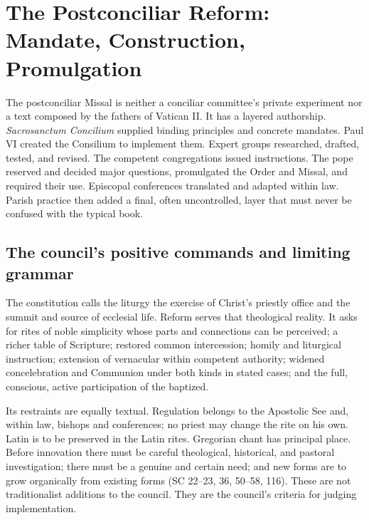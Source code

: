 \section{The Postconciliar Reform: Mandate, Construction, Promulgation}

The postconciliar Missal is neither a conciliar committee's private experiment nor a text composed by the fathers of Vatican II. It has a layered authorship. \emph{Sacrosanctum Concilium} supplied binding principles and concrete mandates. Paul VI created the Consilium to implement them. Expert groups researched, drafted, tested, and revised. The competent congregations issued instructions. The pope reserved and decided major questions, promulgated the Order and Missal, and required their use. Episcopal conferences translated and adapted within law. Parish practice then added a final, often uncontrolled, layer that must never be confused with the typical book.

\subsection{The council's positive commands and limiting grammar}

The constitution calls the liturgy the exercise of Christ's priestly office and the summit and source of ecclesial life. Reform serves that theological reality. It asks for rites of noble simplicity whose parts and connections can be perceived; a richer table of Scripture; restored common intercession; homily and liturgical instruction; extension of vernacular within competent authority; widened concelebration and Communion under both kinds in stated cases; and the full, conscious, active participation of the baptized.

Its restraints are equally textual. Regulation belongs to the Apostolic See and, within law, bishops and conferences; no priest may change the rite on his own. Latin is to be preserved in the Latin rites. Gregorian chant has principal place. Before innovation there must be careful theological, historical, and pastoral investigation; there must be a genuine and certain need; and new forms are to grow organically from existing forms (SC 22--23, 36, 50--58, 116). These are not traditionalist additions to the council. They are the council's criteria for judging implementation.

